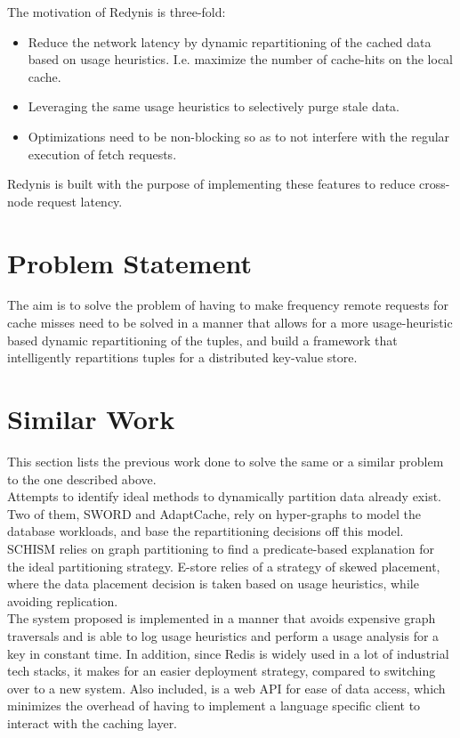 \documentclass{sig-alternate}
\begin{document}
The motivation of Redynis is three-fold:
\begin{itemize}
	\item Reduce the network latency by dynamic repartitioning of the cached data based on usage heuristics. I.e. maximize the number of cache-hits on the local cache.
	\item Leveraging the same usage heuristics to selectively purge stale data.
	\item Optimizations need to be non-blocking so as to not interfere with the regular execution of fetch requests.
\end{itemize}

Redynis is built with the purpose of implementing these features to reduce cross-node request latency.


\section{Problem Statement}
The aim is to solve the problem of having to make frequency remote requests for cache misses need to be solved in a manner that allows for a more usage-heuristic based dynamic repartitioning of the tuples, and build a framework that intelligently repartitions tuples for a distributed key-value store.\\


\section{Similar Work}
This section lists the previous work done to solve the same or a similar problem to the one described above.\\

Attempts to identify ideal methods to dynamically partition data already exist. Two of them, SWORD\cite{quamar2013sword} and AdaptCache\cite{asad2016adaptcache}, rely on hyper-graphs to model the database workloads, and base the repartitioning decisions off this model. SCHISM\cite{curino2010schism} relies on graph partitioning to find a predicate-based explanation for the ideal partitioning strategy. E-store\cite{taft2014store} relies of a strategy of skewed placement, where the data placement decision is taken based on usage heuristics, while avoiding replication. \\

The system proposed is implemented in a manner that avoids expensive graph traversals and is able to log usage heuristics and perform a usage analysis for a key in constant time. In addition, since Redis is widely used in a lot of industrial tech stacks\cite{redis-popularity}, it makes for an easier deployment strategy, compared to switching over to a new system. Also included, is a web API for ease of data access, which minimizes the overhead of having to implement a language specific client to interact with the caching layer.\\
\end{document}
